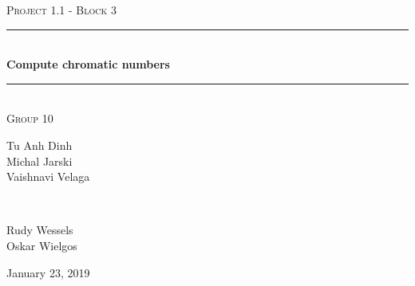 \documentclass[a4paper]{report}
\begin{document}
	\begin{titlepage} 
		\newcommand{\HRule}{\rule{\linewidth}{0.5mm}}
		
		\center 
		
		\textsc{\large Project 1.1 - Block 3}\\[0.5cm] 
		
		\HRule\\[0.4cm]
		
		{\huge\bfseries Compute chromatic numbers}\\[0.4cm] 
		
		\HRule\\[1.5cm]
		
		\textsc{\large Group 10}\\[0.5cm]

		\begin{minipage}{0.6\textwidth}
			\begin{flushleft}
				Tu Anh Dinh\\Michal Jarski\\Vaishnavi Velaga
			\end{flushleft}
		\end{minipage}
		~
		\begin{minipage}{0.3\textwidth}
			\begin{flushleft}
				Rudy Wessels\\Oskar Wielgos\\
			\end{flushleft}
		\end{minipage}
		
		\vspace{2cm}
		
		January 23, 2019
		
		
	\end{titlepage}
	
	
	
	
	
\end{document}
